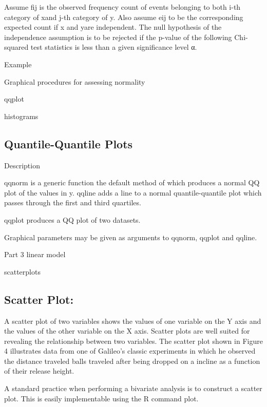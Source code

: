 Assume fij is the observed frequency count of events belonging to both i-th category of xand j-th category of y. Also assume eij to be the corresponding expected count if x and yare independent. The null hypothesis of the independence assumption is to be rejected if the p-value of the following Chi-squared test statistics is less than a given significance level α.



Example

 Graphical procedures for assessing normality

qqplot

histograms


\subsection{Quantile-Quantile Plots}

Description

qqnorm is a generic function the default method of which produces a normal QQ plot of the values in y. qqline adds a line to a normal quantile-quantile plot which passes through the first and third quartiles.

qqplot produces a QQ plot of two datasets.

Graphical parameters may be given as arguments to qqnorm, qqplot and qqline.



Part 3 linear model

scatterplots


\subsection{Scatter Plot:}

 A scatter plot of two variables shows the values of one variable on the Y axis and the values of the other variable on the X axis. Scatter plots are well suited for revealing the relationship between two variables. The scatter plot shown in Figure 4 illustrates data from one of Galileo's classic experiments in which he observed the distance traveled balls traveled after being dropped on a incline as a function of their release height.



A standard practice when performing a bivariate analysis is to construct a scatter plot. This is easily implementable using the R command plot.

